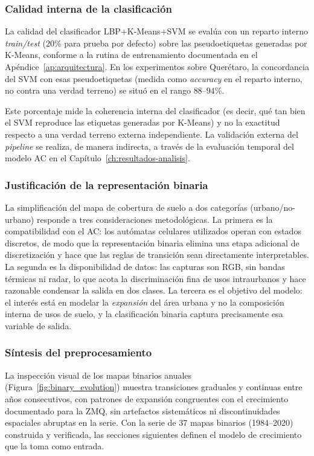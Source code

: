 \subsubsection{Calidad interna de la clasificación}
\label{ssec:calidad-clasificacion}

La calidad del clasificador LBP+K-Means+SVM se evalúa con un reparto interno \textit{train/test} ($20$\% para prueba por defecto) sobre las pseudoetiquetas generadas por K-Means, conforme a la rutina de entrenamiento documentada en el Apéndice~\ref{ap:arquitectura}. En los experimentos sobre Querétaro, la concordancia del SVM con esas pseudoetiquetas (medida como \textit{accuracy} en el reparto interno, no contra una verdad terreno) se situó en el rango $88$--$94$\%.

Este porcentaje mide la coherencia interna del clasificador (es decir, qué tan bien el SVM reproduce las etiquetas generadas por K-Means) y no la exactitud respecto a una verdad terreno externa independiente. La validación externa del \textit{pipeline} se realiza, de manera indirecta, a través de la evaluación temporal del modelo AC en el Capítulo~\ref{ch:resultados-analisis}.

\subsubsection{Justificación de la representación binaria}

La simplificación del mapa de cobertura de suelo a dos categorías (urbano/no-urbano) responde a tres consideraciones metodológicas. La primera es la compatibilidad con el AC: los autómatas celulares utilizados operan con estados discretos, de modo que la representación binaria elimina una etapa adicional de discretización y hace que las reglas de transición sean directamente interpretables. La segunda es la disponibilidad de datos: las capturas son RGB, sin bandas térmicas ni radar, lo que acota la discriminación fina de usos intraurbanos y hace razonable condensar la salida en dos clases. La tercera es el objetivo del modelo: el interés está en modelar la \textit{expansión} del área urbana y no la composición interna de usos de suelo, y la clasificación binaria captura precisamente esa variable de salida.

\subsubsection{Síntesis del preprocesamiento}

La inspección visual de los mapas binarios anuales (Figura~\ref{fig:binary_evolution}) muestra transiciones graduales y continuas entre años consecutivos, con patrones de expansión congruentes con el crecimiento documentado para la ZMQ, sin artefactos sistemáticos ni discontinuidades espaciales abruptas en la serie. Con la serie de 37 mapas binarios (1984--2020) construida y verificada, las secciones siguientes definen el modelo de crecimiento que la toma como entrada.


